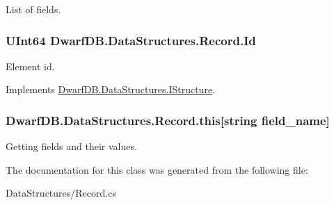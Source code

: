 List of fields. 

\hypertarget{class_dwarf_d_b_1_1_data_structures_1_1_record_a6b33388f9fa7edcea1e29890da207be4}{
\subsubsection[{Id}]{\setlength{\rightskip}{0pt plus 5cm}UInt64 DwarfDB.DataStructures.Record.Id}}
\label{class_dwarf_d_b_1_1_data_structures_1_1_record_a6b33388f9fa7edcea1e29890da207be4}


Element id. 



Implements \hyperlink{interface_dwarf_d_b_1_1_data_structures_1_1_i_structure_a9fab102fba11f70ab46272b53201784d}{DwarfDB.DataStructures.IStructure}.

\hypertarget{class_dwarf_d_b_1_1_data_structures_1_1_record_a303a0895fdeb635fa47469b2ac46c4a3}{
\subsubsection[{this}]{ DwarfDB.DataStructures.Record.this\mbox{[}string field\_\-name\mbox{]}}}
\label{class_dwarf_d_b_1_1_data_structures_1_1_record_a303a0895fdeb635fa47469b2ac46c4a3}


Getting fields and their values. 



The documentation for this class was generated from the following file:\begin{DoxyCompactItemize}
\item 
DataStructures/Record.cs\end{DoxyCompactItemize}
